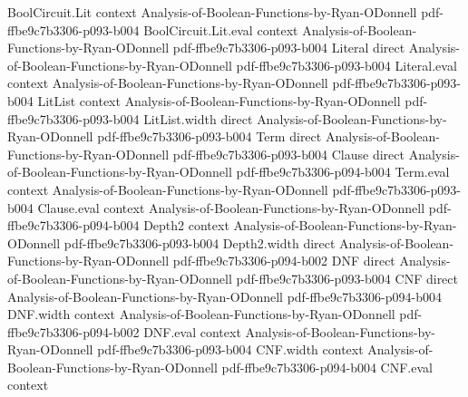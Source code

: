 \begin{lemma}
\leanok
{}
\proofstep
  {BoolCircuit.Lit}
  {context}
  {Analysis-of-Boolean-Functions-by-Ryan-ODonnell}
  {pdf-ffbe9c7b3306-p093-b004}
\proofstep
  {BoolCircuit.Lit.eval}
  {context}
  {Analysis-of-Boolean-Functions-by-Ryan-ODonnell}
  {pdf-ffbe9c7b3306-p093-b004}
\proofstep
  {Literal}
  {direct}
  {Analysis-of-Boolean-Functions-by-Ryan-ODonnell}
  {pdf-ffbe9c7b3306-p093-b004}
\proofstep
  {Literal.eval}
  {context}
  {Analysis-of-Boolean-Functions-by-Ryan-ODonnell}
  {pdf-ffbe9c7b3306-p093-b004}
\proofstep
  {LitList}
  {context}
  {Analysis-of-Boolean-Functions-by-Ryan-ODonnell}
  {pdf-ffbe9c7b3306-p093-b004}
\proofstep
  {LitList.width}
  {direct}
  {Analysis-of-Boolean-Functions-by-Ryan-ODonnell}
  {pdf-ffbe9c7b3306-p093-b004}
\proofstep
  {Term}
  {direct}
  {Analysis-of-Boolean-Functions-by-Ryan-ODonnell}
  {pdf-ffbe9c7b3306-p093-b004}
\proofstep
  {Clause}
  {direct}
  {Analysis-of-Boolean-Functions-by-Ryan-ODonnell}
  {pdf-ffbe9c7b3306-p094-b004}
\proofstep
  {Term.eval}
  {context}
  {Analysis-of-Boolean-Functions-by-Ryan-ODonnell}
  {pdf-ffbe9c7b3306-p093-b004}
\proofstep
  {Clause.eval}
  {context}
  {Analysis-of-Boolean-Functions-by-Ryan-ODonnell}
  {pdf-ffbe9c7b3306-p094-b004}
\proofstep
  {Depth2}
  {context}
  {Analysis-of-Boolean-Functions-by-Ryan-ODonnell}
  {pdf-ffbe9c7b3306-p093-b004}
\proofstep
  {Depth2.width}
  {direct}
  {Analysis-of-Boolean-Functions-by-Ryan-ODonnell}
  {pdf-ffbe9c7b3306-p094-b002}
\proofstep
  {DNF}
  {direct}
  {Analysis-of-Boolean-Functions-by-Ryan-ODonnell}
  {pdf-ffbe9c7b3306-p093-b004}
\proofstep
  {CNF}
  {direct}
  {Analysis-of-Boolean-Functions-by-Ryan-ODonnell}
  {pdf-ffbe9c7b3306-p094-b004}
\proofstep
  {DNF.width}
  {context}
  {Analysis-of-Boolean-Functions-by-Ryan-ODonnell}
  {pdf-ffbe9c7b3306-p094-b002}
\proofstep
  {DNF.eval}
  {context}
  {Analysis-of-Boolean-Functions-by-Ryan-ODonnell}
  {pdf-ffbe9c7b3306-p093-b004}
\proofstep
  {CNF.width}
  {context}
  {Analysis-of-Boolean-Functions-by-Ryan-ODonnell}
  {pdf-ffbe9c7b3306-p094-b004}
\proofstep
  {CNF.eval}
  {context}

\end{lemma}
